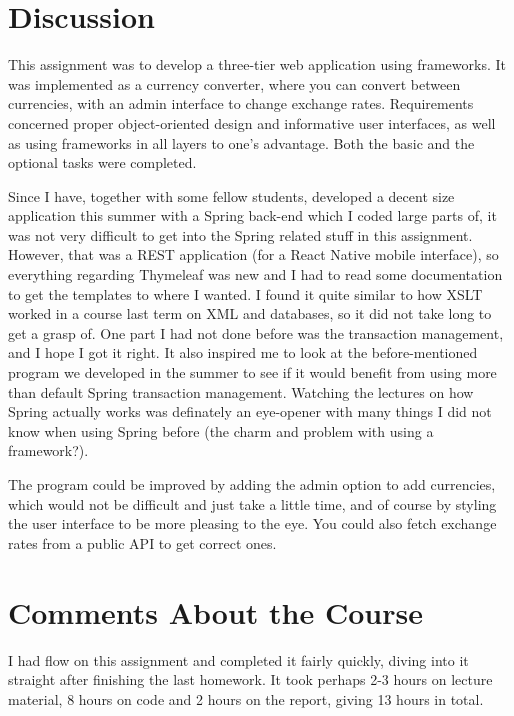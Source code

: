 \documentclass[a4paper]{scrartcl}
\begin{document}
\section{Discussion}

This assignment was to develop a three-tier web application using frameworks. It was implemented as a currency converter, where you can convert between currencies, with an admin interface to change exchange rates. Requirements concerned proper object-oriented design and informative user interfaces, as well as using frameworks in all layers to one's advantage. Both the basic and the optional tasks were completed.

Since I have, together with some fellow students, developed a decent size application this summer with a Spring back-end which I coded large parts of, it was not very difficult to get into the Spring related stuff in this assignment. However, that was a REST application (for a React Native mobile interface), so everything regarding Thymeleaf was new and I had to read some documentation to get the templates to where I wanted. I found it quite similar to how XSLT worked in a course last term on XML and databases, so it did not take long to get a grasp of. One part I had not done before was the transaction management, and I hope I got it right. It also inspired me to look at the before-mentioned program we developed in the summer to see if it would benefit from using more than default Spring transaction management. Watching the lectures on how Spring actually works was definately an eye-opener with many things I did not know when using Spring before (the charm and problem with using a framework?).

The program could be improved by adding the admin option to add currencies, which would not be difficult and just take a little time, and of course by styling the user interface to be more pleasing to the eye. You could also fetch exchange rates from a public API to get correct ones.

\section{Comments About the Course}

I had flow on this assignment and completed it fairly quickly, diving into it straight after finishing the last homework. It took perhaps 2-3 hours on lecture material, 8 hours on code and 2 hours on the report, giving 13 hours in total.
\end{document}
